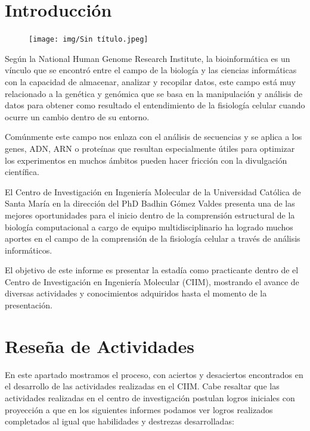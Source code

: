 \documentclass[a4paper, 12pt]{article}
\begin{document}

\section{Introducción}

\begin{figure}
     \vspace{-20pt}
        \begin{center}
            \texttt{[image: img/Sin título.jpeg]}
        \end{center}
    \vspace{-20pt}
\end{figure}

Según la National Human Genome Research Institute, la bioinformática es  un vínculo que se encontró entre el campo de la biología y las ciencias informáticas con la capacidad de almacenar, analizar y recopilar datos, este campo está muy relacionado a la genética y genómica que se basa en la manipulación y análisis de datos para obtener como resultado el entendimiento de la fisiología celular cuando ocurre un cambio dentro de su entorno.


Comúnmente este campo nos enlaza con el análisis de secuencias y se aplica a los genes, ADN,  ARN o proteínas que resultan especialmente útiles para optimizar los experimentos en muchos ámbitos pueden hacer fricción con la divulgación científica. 

El Centro de Investigación en Ingeniería Molecular de la Universidad Católica de Santa María en la dirección del PhD Badhin Gómez Valdes presenta una de las mejores oportunidades para el inicio dentro de la comprensión estructural de la biología computacional a cargo de equipo multidisciplinario ha logrado muchos aportes en el campo de la comprensión de la fisiología celular a través de análisis informáticos.

El objetivo de este informe es presentar la estadía como practicante dentro de el Centro de Investigación en Ingeniería Molecular (CIIM), mostrando el avance de diversas actividades y conocimientos adquiridos hasta el momento de la presentación.


\section{Reseña de Actividades}
En este apartado mostramos el proceso, con aciertos y desaciertos encontrados en el desarrollo de las actividades realizadas en el CIIM. Cabe resaltar que las actividades realizadas en el centro de investigación postulan logros iniciales con proyección a que en los siguientes informes podamos ver logros realizados completados al igual que habilidades y destrezas desarrolladas:
\end{document}
